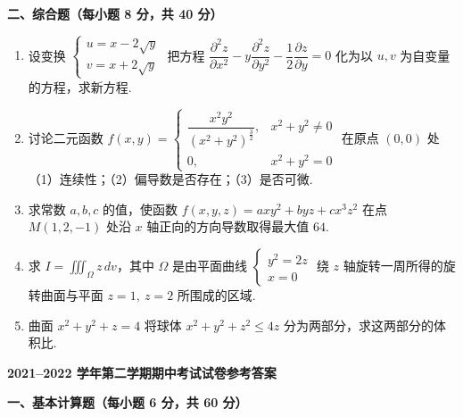 \documentclass[a4paper,11pt]{ctexart}
\begin{document}
\vspace{0.8em}

\textbf{二、综合题（每小题 8 分，共 40 分）}

\begin{enumerate}[label=\arabic*、, leftmargin=2.2em, itemsep=0.9em, topsep=0.6em]
  \item 设变换 $\begin{cases} u = x - 2\sqrt{y} \\ v = x + 2\sqrt{y} \end{cases}$ 把方程 $\dfrac{\partial^2 z}{\partial x^2} - y\dfrac{\partial^2 z}{\partial y^2} - \dfrac{1}{2}\dfrac{\partial z}{\partial y} = 0$ 化为以 $u,v$ 为自变量的方程，求新方程.

  \item 讨论二元函数 $f(x,y) = \begin{cases} \dfrac{x^2y^2}{(x^2+y^2)^{\frac{3}{2}}}, & x^2+y^2 \neq 0 \\ 0, & x^2+y^2 = 0 \end{cases}$ 在原点 $(0,0)$ 处（1）连续性；（2）偏导数是否存在；（3）是否可微.

  \item 求常数 $a,b,c$ 的值，使函数 $f(x,y,z) = axy^2 + byz + cx^3z^2$ 在点 $M(1,2,-1)$ 处沿 $x$ 轴正向的方向导数取得最大值 $64$.

  \item 求 $I = \displaystyle\iiint_\Omega z\,dv$，其中 $\Omega$ 是由平面曲线 $\begin{cases} y^2 = 2z \\ x = 0 \end{cases}$ 绕 $z$ 轴旋转一周所得的旋转曲面与平面 $z=1,\ z=2$ 所围成的区域.

  \item 曲面 $x^2 + y^2 + z = 4$ 将球体 $x^2 + y^2 + z^2 \le 4z$ 分为两部分，求这两部分的体积比.
\end{enumerate}

\newpage

\begin{center}
  {\Large\bfseries 2021--2022 学年第二学期期中考试试卷参考答案}
\end{center}

\vspace{0.6em}

\textbf{一、基本计算题（每小题 6 分，共 60 分）}
\end{document}
